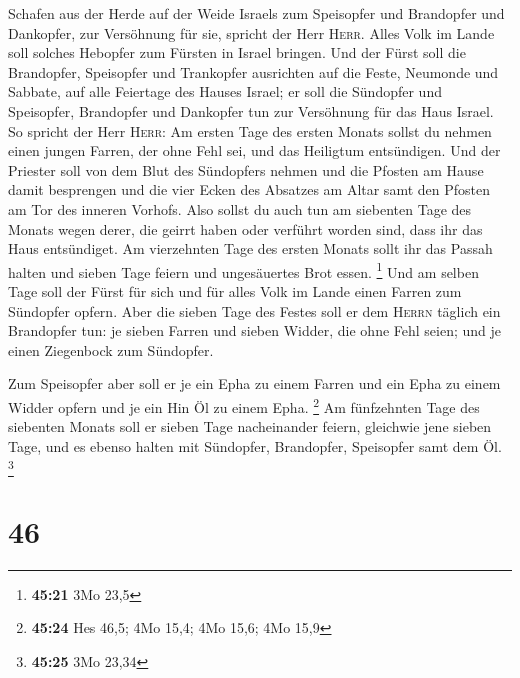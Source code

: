 Schafen aus der Herde auf der Weide Israels zum Speisopfer und
Brandopfer und Dankopfer, zur Versöhnung für sie, spricht der Herr
\textsc{Herr}.  Alles Volk im Lande soll solches Hebopfer
zum Fürsten in Israel bringen.  Und der Fürst soll die
Brandopfer, Speisopfer und Trankopfer ausrichten auf die Feste, Neumonde
und Sabbate, auf alle Feiertage des Hauses Israel; er soll die Sündopfer
und Speisopfer, Brandopfer und Dankopfer tun zur Versöhnung für das Haus
Israel.  So spricht der Herr \textsc{Herr}: Am ersten
Tage des ersten Monats sollst du nehmen einen jungen Farren, der ohne
Fehl sei, und das Heiligtum entsündigen.  Und der
Priester soll von dem Blut des Sündopfers nehmen und die Pfosten am
Hause damit besprengen und die vier Ecken des Absatzes am Altar samt den
Pfosten am Tor des inneren Vorhofs.  Also sollst du auch
tun am siebenten Tage des Monats wegen derer, die geirrt haben oder
verführt worden sind, dass ihr das Haus entsündiget.  Am
vierzehnten Tage des ersten Monats sollt ihr das Passah halten und
sieben Tage feiern und ungesäuertes Brot essen. \footnote{\textbf{45:21}
  3Mo 23,5}  Und am selben Tage soll der Fürst für sich
und für alles Volk im Lande einen Farren zum Sündopfer opfern.
 Aber die sieben Tage des Festes soll er dem
\textsc{Herrn} täglich ein Brandopfer tun: je sieben Farren und sieben
Widder, die ohne Fehl seien; und je einen Ziegenbock zum Sündopfer.

 Zum Speisopfer aber soll er je ein Epha zu einem Farren
und ein Epha zu einem Widder opfern und je ein Hin Öl zu einem Epha.
\footnote{\textbf{45:24} Hes 46,5; 4Mo 15,4; 4Mo 15,6; 4Mo 15,9}
 Am fünfzehnten Tage des siebenten Monats soll er sieben
Tage nacheinander feiern, gleichwie jene sieben Tage, und es ebenso
halten mit Sündopfer, Brandopfer, Speisopfer samt dem Öl. \footnote{\textbf{45:25}
  3Mo 23,34}

\hypertarget{section-14}{%
\section{46}\label{section-14}}

